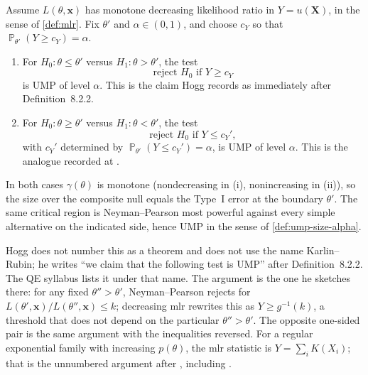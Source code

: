 \documentclass[11pt,a4paper]{article}
\DeclareMathOperator{\Pbb}{\mathbb{P}}
\begin{document}
\begin{theorem}
\label{thm:karlin-rubin}
Assume \(L(\theta,\mathbf{x})\) has monotone decreasing likelihood ratio in \(Y=u(\mathbf{X})\), in the sense of \cref{def:mlr}. Fix \(\theta'\) and \(\alpha\in(0,1)\), and choose \(c_Y\) so that \(\Pbb_{\theta'}(Y\ge c_Y)=\alpha\).
\begin{enumerate}[label=\textup{(\roman*)}]
    \item
    For \(H_0:\theta\le\theta'\) versus \(H_1:\theta>\theta'\), the test
    \[
    \text{reject }H_0\text{ if }Y\ge c_Y
    \]
    is UMP of level \(\alpha\). This is the claim Hogg records as \citep[(8.2.3)]{hogg2019} immediately after Definition~8.2.2.
    \item
    For \(H_0:\theta\ge\theta'\) versus \(H_1:\theta<\theta'\), the test
    \[
    \text{reject }H_0\text{ if }Y\le c_Y',
    \]
    with \(c_Y'\) determined by \(\Pbb_{\theta'}(Y\le c_Y')=\alpha\), is UMP of level \(\alpha\). This is the analogue recorded at \citep[(8.2.6)]{hogg2019}.
\end{enumerate}
In both cases \(\gamma(\theta)\) is monotone (nondecreasing in (i), nonincreasing in (ii)), so the size over the composite null equals the Type~I error at the boundary \(\theta'\). The same critical region is Neyman--Pearson most powerful against every simple alternative on the indicated side, hence UMP in the sense of \cref{def:ump-size-alpha}.
\end{theorem}

Hogg does not number this as a theorem and does not use the name Karlin--Rubin; he writes ``we claim that the following test is UMP'' after Definition~8.2.2. The QE syllabus lists it under that name. The argument is the one he sketches there: for any fixed \(\theta''>\theta'\), Neyman--Pearson \citep[Theorem~8.1.1]{hogg2019} rejects for \(L(\theta',\mathbf{x})/L(\theta'',\mathbf{x})\le k\); decreasing mlr rewrites this as \(Y\ge g^{-1}(k)\), a threshold that does not depend on the particular \(\theta''>\theta'\). The opposite one-sided pair is the same argument with the inequalities reversed. For a regular exponential family with increasing \(p(\theta)\), the mlr statistic is \(Y=\sum_i K(X_i)\); that is the unnumbered argument after \citep[Example~8.2.5]{hogg2019}, including \citep[(8.2.5)--(8.2.6)]{hogg2019}.
\end{document}
